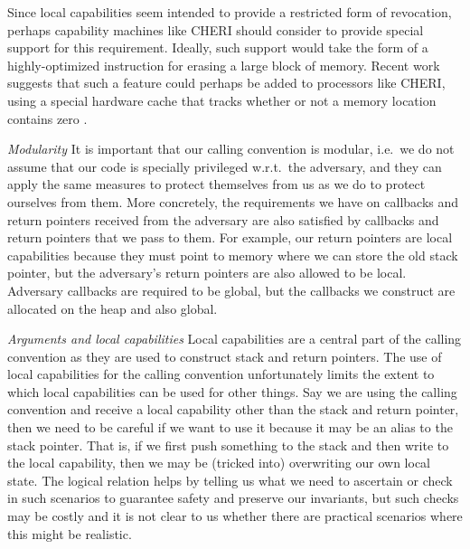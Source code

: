 \documentclass[format=acmsmall, review=true, screen=true]{acmart}
\begin{document}
Since local capabilities seem intended to provide a restricted form of revocation, perhaps capability machines like CHERI should consider to provide special support for this requirement.
Ideally, such support would take the form of a highly-optimized instruction for erasing a large block of memory.
Recent work suggests that such a feature could perhaps be added to processors like CHERI, using a special hardware cache that tracks whether or not a memory location contains zero \citep{Joannou2017EfficientTaggedMemory}.


\emph{Modularity} It is important that our calling convention is modular, i.e.\ we do not assume that our code is specially privileged w.r.t.\ the adversary, and they can apply the same measures to protect themselves from us as we do to protect ourselves from them.
More concretely, the requirements we have on callbacks and return pointers received from the adversary are also satisfied by callbacks and return pointers that we pass to them.
For example, our return pointers are local capabilities because they must point to memory where we can store the old stack pointer, but the adversary's return pointers are also allowed to be local.
Adversary callbacks are required to be global, but the callbacks we construct are allocated on the heap and also global.

\emph{Arguments and local capabilities} 
Local capabilities are a central part of the calling convention as they are used
to construct stack and return pointers. The use of local capabilities for the
calling convention unfortunately limits the extent to which local capabilities
can be used for other things. Say we are using the calling convention and
receive a local capability other than the stack and return pointer, then we need
to be careful if we want to use it because it may be an alias to the stack
pointer. That is, if we first push something to the stack and then write to the
local capability, then we may be (tricked into) overwriting our own local state.
The logical relation helps by telling us what we need to ascertain or check in
such scenarios to guarantee safety and preserve our invariants, but such checks
may be costly and it is not clear to us whether there are practical scenarios
where this might be realistic.
\end{document}
